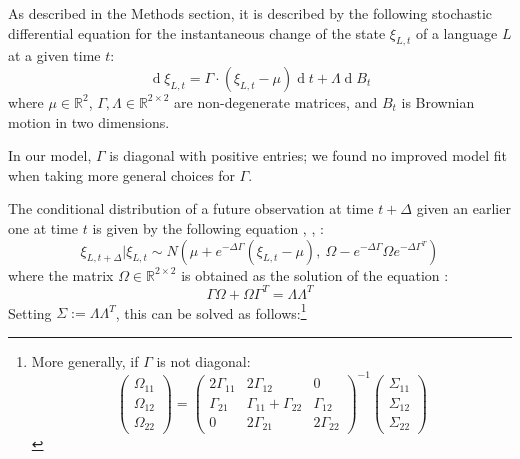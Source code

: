 \documentclass[11pt,a4paper]{article}
\begin{document}
As described in the Methods section, it is described by the following stochastic differential equation for the instantaneous change of the state $\xi_{L,t}$ of a language $L$ at a given time $t$:
\begin{equation*}
    \operatorname{d}\xi_{L,t} = \Gamma \cdot (\xi_{L,t}-\mu) \operatorname{d}t + \Lambda \operatorname{d}B_t
\end{equation*}
where $\mu \in \mathbb{R}^2$,  $\Gamma, \Lambda \in \mathbb{R}^{2\times 2}$ are non-degenerate matrices, and $B_t$ is Brownian motion in two dimensions.

In our model, $\Gamma$ is diagonal with positive entries; we found no improved model fit when taking more general choices for $\Gamma$.

The conditional distribution of a future observation at time $t+\Delta$ given an earlier one at time $t$ is given by the following equation \citep[Theorem 3.3]{schach1971weak}, \citep{gardiner1983handbook}, \citep[p. 156, eq. 6.124]{risken1989fokker}:
\begin{equation}
\xi_{L,t+\Delta} | \xi_{L,t} \sim N\left(\mu + e^{-\Delta \Gamma} (\xi_{L,t}-\mu),\ \Omega - e^{-\Delta \Gamma} \Omega e^{-\Delta \Gamma^T}\right)
\end{equation}
where the matrix $\Omega \in \mathbb{R}^{2\times 2}$ is obtained as the solution of the equation \citep[p. 110, eq. 4.4.51]{gardiner1983handbook} \citep[p. 156, eq. 6.126]{risken1989fokker}:
\begin{equation}
    \Gamma\Omega+\Omega\Gamma^T = \Lambda \Lambda^T
\end{equation}
Setting $\Sigma := \Lambda\Lambda^T$, this can be solved as follows:\footnote{More generally, if $\Gamma$ is not diagonal:
\begin{equation}\label{eq:sigma-omega}
\left(\begin{matrix} \Omega_{11} \\ \Omega_{12} \\ \Omega_{22} \end{matrix}\right)=    \left(\begin{matrix}
    2\Gamma_{11} & 2\Gamma_{12} & 0 \\
    \Gamma_{21} & \Gamma_{11}+\Gamma_{22} & \Gamma_{12} \\
    0 & 2\Gamma_{21} & 2\Gamma_{22}
    \end{matrix}\right)^{-1}  \left(\begin{matrix} \Sigma_{11} \\ \Sigma_{12} \\ \Sigma_{22} \end{matrix}\right)
\end{equation}
}
\end{document}
